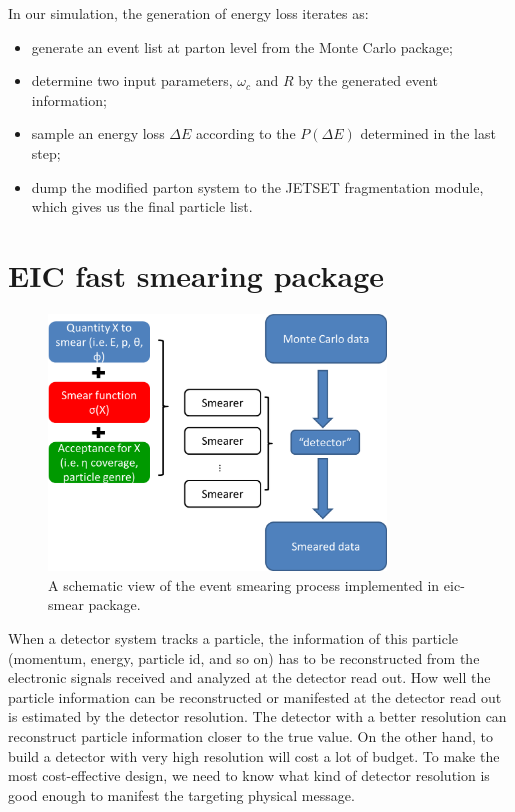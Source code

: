 In our simulation, the generation of energy loss iterates as:
\begin{itemize}
	\item generate an event list at parton level from the Monte Carlo package;
	\item determine two input parameters, $\omega_{c}$ and $R$ by the generated event information;
	\item sample an energy loss $\Delta E$ according to the $P(\Delta E)$ determined in the last step;
	\item dump the modified parton system to the JETSET fragmentation module, which gives us the final particle list.
\end{itemize}

%

\section{EIC fast smearing package}


\begin{figure}
\centering
\includegraphics[width=0.8\textwidth]{plots/chpt5/smearing framework.png}
\caption[An illustration of the event smearing strategy in the eic-smear package] {
A schematic view of the event smearing process implemented in eic-smear package. 
}
\label{fig:smear_layout}
\end{figure}


When a detector system tracks a particle, the information of this particle
(momentum, energy, particle id, and so on) has to be reconstructed from the electronic
signals received and analyzed at the detector read out. How well the particle
information can be reconstructed or manifested at the detector read out is
estimated by the detector resolution. The detector with a better resolution
can reconstruct particle information closer to the true value. On
the other hand, to build a detector with very high resolution will cost a lot
of budget. To make the most cost-effective design, we need to know what kind
of detector resolution is good enough to manifest the targeting physical message.

